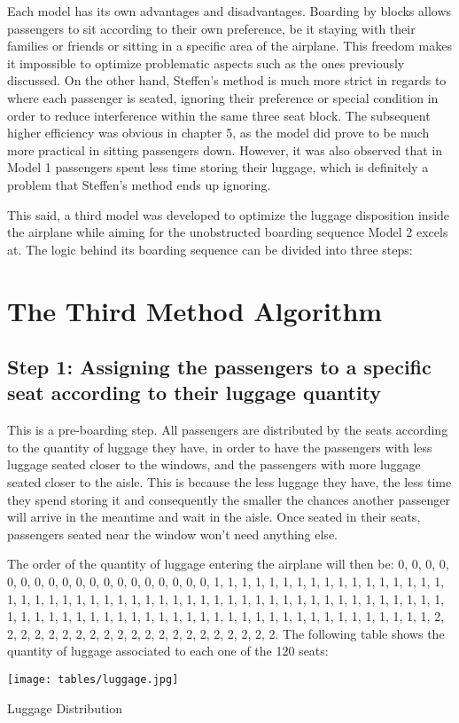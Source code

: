 Each model has its own advantages and disadvantages. Boarding by blocks allows passengers to sit according to their own preference, be it staying with their families or friends or sitting in a specific area of the airplane. This freedom makes it impossible to optimize problematic aspects such as the ones previously discussed. On the other hand, Steffen’s method is much more strict in regards to where each passenger is seated, ignoring their preference or special condition in order to reduce interference within the same three seat block. The subsequent higher efficiency was obvious in chapter 5, as the model did prove to be much more practical in sitting passengers down. However, it was also observed that in Model 1 passengers spent less time storing their luggage, which is definitely a problem that Steffen’s method ends up ignoring.

\indent\newline
This said, a third model was developed to optimize the luggage disposition inside the airplane while aiming for the unobstructed boarding sequence Model 2 excels at. The logic behind its boarding sequence can be divided into three steps:

\section{The Third Method Algorithm}
\subsection{Step 1: Assigning the passengers to a specific seat according to their luggage quantity}
This is a pre-boarding step. All passengers are distributed by the seats according to the quantity of luggage they have, in order to have the passengers with less luggage seated closer to the windows, and the passengers with more luggage seated closer to the aisle. This is because the less luggage they have, the less time they spend storing it and consequently the smaller the chances another passenger will arrive in the meantime and wait in the aisle. Once seated in their seats, passengers seated near the window won't need anything else. 

\indent\newline
The order of the quantity of luggage entering the airplane will then be: 0, 0, 0, 0, 0, 0, 0, 0, 0, 0, 0, 0, 0, 0, 0, 0, 0, 0, 0, 1, 1, 1, 1, 1, 1, 1, 1, 1, 1, 1, 1, 1, 1, 1, 1, 1, 1, 1, 1, 1, 1, 1, 1, 1, 1, 1, 1, 1, 1, 1, 1, 1, 1, 1, 1, 1, 1, 1, 1, 1, 1, 1, 1, 1, 1, 1, 1, 1, 1, 1, 1, 1, 1, 1, 1, 1, 1, 1, 1, 1, 1, 1, 1, 1, 1, 1, 1, 1, 1, 1, 1, 1, 1, 1, 1, 1, 1, 1, 1, 2, 2, 2, 2, 2, 2, 2, 2, 2, 2, 2, 2, 2, 2, 2, 2, 2, 2, 2, 2, 2. The following table shows the quantity of luggage associated to each one of the 120 seats:
\begin{table}[H]
  \texttt{[image: tables/luggage.jpg]}
  \caption{Luggage Distribution}
  \label{tbl:luggage}
\end{table}
